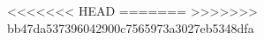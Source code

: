 \documentclass[final]{beamer}
\newlength{\sepwidth}
\newlength{\colwidth}
\newcommand{\separatorcolumn}{\begin{column}{\sepwidth}\end{column}}
\begin{document}
\begin{frame}[t]
\begin{columns}[t]
\begin{column}{\colwidth}
\begin{block}{}
<<<<<<< HEAD
  \vspace{-0.2em}
=======
  \vspace{-0.5ex}
>>>>>>> bb47da537396042900c7565973a3027eb5348dfa
    \tiny{
    }
\end{block}



  \vspace{0.2em}

  

\end{column}

\separatorcolumn
\end{columns}
\end{frame}
\end{document}
